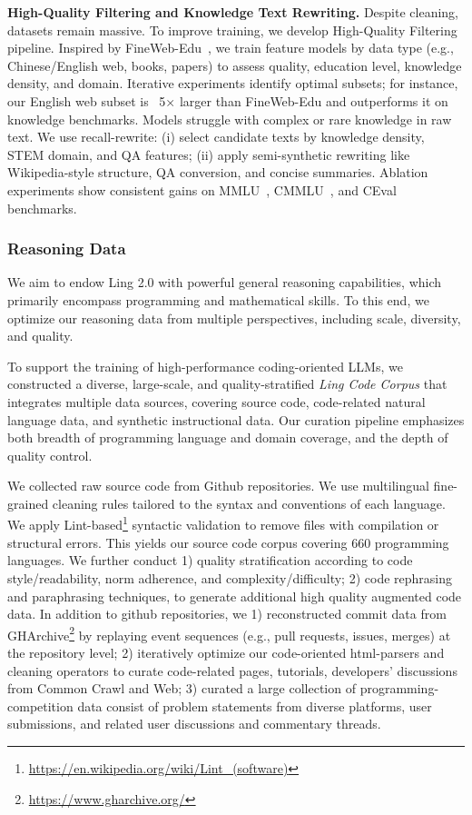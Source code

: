 {\bfseries High-Quality Filtering and Knowledge Text Rewriting.} 
Despite cleaning, datasets remain massive. To improve training, we develop  
High-Quality Filtering pipeline. Inspired by FineWeb-Edu~\citep{penedo2024finewebdatasetsdecantingweb}, we train feature models by data type (e.g., Chinese/English web, books, papers) to assess quality, education level, knowledge density, and domain. Iterative experiments identify optimal subsets; for instance, our English web subset is ~5× larger than FineWeb-Edu and outperforms it on knowledge benchmarks. Models struggle with complex or rare knowledge in raw text. We use recall-rewrite: (i) select candidate texts by knowledge density, STEM domain, and QA features; (ii) apply semi-synthetic rewriting like Wikipedia-style structure, QA conversion, and concise summaries. Ablation experiments show consistent gains on MMLU~\citep{mmlu}, CMMLU~\citep{cmmlu}, and CEval~\citep{ceval} benchmarks.







\subsubsection{Reasoning Data}
We aim to endow Ling 2.0 with powerful general reasoning capabilities, which primarily encompass programming and mathematical skills. To this end, we optimize our reasoning data from multiple perspectives, including scale, diversity, and quality.

To support the training of high-performance coding-oriented LLMs, we constructed a diverse, large-scale, and quality-stratified \emph{Ling Code Corpus} that integrates multiple data sources, covering source code, code-related natural language data, and synthetic instructional data. 
Our curation pipeline emphasizes both breadth of programming language and domain coverage, and the depth of quality control.
\label{1b-coder-section}

We collected raw source code from Github repositories. We use
multilingual fine-grained cleaning rules tailored to the syntax and conventions of each language. We apply Lint-based\footnote{\url{https://en.wikipedia.org/wiki/Lint_(software)}} syntactic validation to remove files with compilation or structural errors. This yields our source code corpus covering 660 programming languages. We further conduct 1) quality stratification according to code style/readability, norm adherence, and complexity/difficulty; 2) code rephrasing and paraphrasing techniques, to generate additional high quality augmented code data. In addition to github repositories, we 1) reconstructed commit data from GHArchive\footnote{\url{https://www.gharchive.org/}} by replaying event sequences (e.g., pull requests, issues, merges) at the repository level; 2) iteratively optimize our code-oriented html-parsers and cleaning operators to curate code-related pages, tutorials, developers' discussions from Common Crawl and Web; 3) curated a large collection of programming-competition data consist of problem statements from diverse platforms, user submissions, and related user discussions and commentary threads. 

